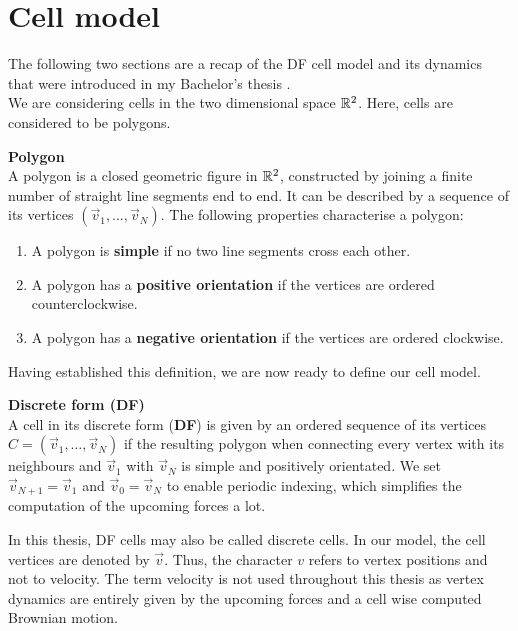 \section{Cell model} 

The following two sections are a recap of the DF cell model and its dynamics that were introduced in my Bachelor's thesis \cite{Vogel2023}. \\
We are considering cells in the two dimensional space $\mathbb{R}^2$. Here, cells are considered to be polygons. 

\begin{definition} \textbf{Polygon} \\
	A polygon is a closed geometric figure in $\mathbb{R}^2$, constructed by joining a finite number of straight line segments end to end. 
	It can be described by a sequence of its vertices $(\vec{v}_1, \ldots, \vec{v}_N)$.
	The following properties characterise a polygon:
	\begin{enumerate}
		\item A polygon is \textbf{simple} if no two line segments cross each other. 
		\item A polygon has a \textbf{positive orientation} if the vertices are ordered counterclockwise.
		\item A polygon has a \textbf{negative orientation} if the vertices are ordered clockwise.
	\end{enumerate}
\end{definition}

Having established this definition, we are now ready to define our cell model.

\begin{definition} \textbf{Discrete form (DF)} \label{def:DF}  \\
	A cell in its discrete form (\textbf{DF}) is given by an ordered sequence of its vertices $C = (\vec{v}_1, \ldots , \vec{v}_N)$ if the resulting polygon when connecting every vertex with its neighbours and $\vec{v}_1$ with $\vec{v}_N$  is simple and positively orientated. 
	We set $\vec{v}_{N+1} = \vec{v}_{1}$ and $\vec{v}_{0} = \vec{v}_{N}$ to enable periodic indexing, which simplifies the computation of the upcoming forces a lot.
\end{definition}

In this thesis, DF cells may also be called discrete cells. 
In our model, the cell vertices are denoted by $\vec{v}$. 
Thus, the character $v$ refers to vertex positions and not to velocity.
The term velocity is not used throughout this thesis as vertex dynamics are entirely given by the upcoming forces and a cell wise computed Brownian motion. \\


